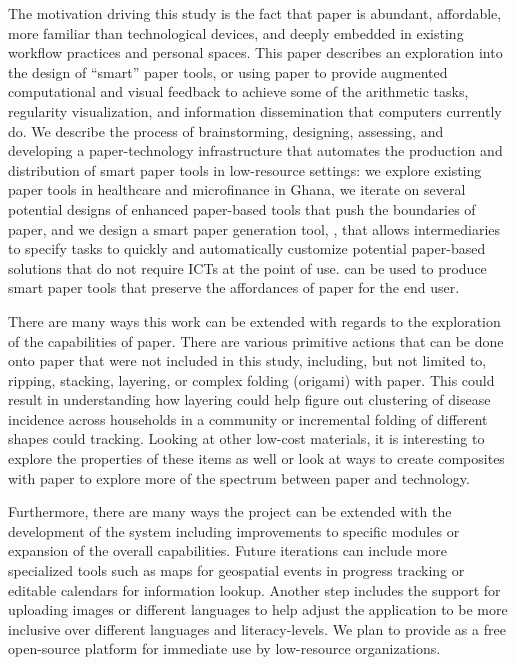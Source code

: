 \documentclass{sig-alternate}
\begin{document}
The motivation driving this study is the fact that paper is abundant, affordable, more familiar than technological devices, and deeply embedded in existing workflow practices and personal spaces. This paper describes an exploration into the design of ``smart'' paper tools, or using paper to provide augmented computational and visual feedback to achieve some of the arithmetic tasks, regularity visualization, and information dissemination that computers currently do. We describe the process of brainstorming, designing, assessing, and developing a paper-technology infrastructure that automates the production and distribution of smart paper tools in low-resource settings: we explore existing paper tools in healthcare and microfinance in Ghana, we iterate on several potential designs of enhanced paper-based tools that push the boundaries of paper, and we design a smart paper generation tool, \nifty, that allows intermediaries to specify tasks to quickly and automatically customize potential paper-based solutions that do not require ICTs at the point of use. \nifty can be used to produce smart paper tools that preserve the affordances of paper for the end user.

There are many ways this work can be extended with regards to the exploration of the capabilities of paper. There are various primitive actions that can be done onto paper that were not included in this study, including, but not limited to, ripping, stacking, layering, or complex folding (origami) with paper. This could result in understanding how layering could help figure out clustering of disease incidence across households in a community or incremental folding of different shapes could  tracking. Looking at other low-cost materials, it is interesting to explore the properties of these items as well or look at ways to create composites with paper to explore more of the spectrum between paper and technology.

Furthermore, there are many ways the project can be extended with the development of the \nifty system including improvements to specific modules or expansion of the overall capabilities. Future iterations can include more specialized tools such as maps for geospatial events in progress tracking or editable calendars for information lookup. Another step includes the support for uploading images or different languages to help adjust the application to be more inclusive over different languages and literacy-levels. We plan to provide \nifty as a free open-source platform for immediate use by low-resource organizations.
\end{document}
